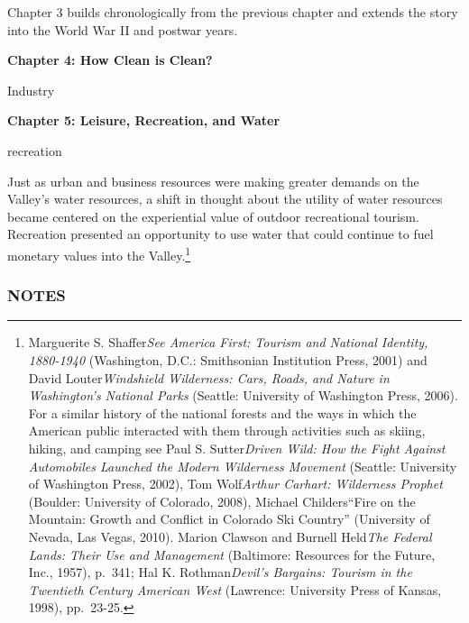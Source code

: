 \documentclass[11pt,article,oneside]{memoir}
\begin{document}
Chapter 3 builds chronologically from the previous chapter and extends
the story into the World War II and postwar years.

\textbf{Chapter 4: How Clean is Clean?}

Industry

\textbf{Chapter 5: Leisure, Recreation, and Water}

recreation

Just as urban and business resources were making greater demands on the
Valley's water resources, a shift in thought about the utility of water
resources became centered on the experiential value of outdoor
recreational tourism. Recreation presented an opportunity to use water
that could continue to fuel monetary values into the Valley.\footnote{Marguerite
  S. Shaffer\emph{See America First: Tourism and National Identity,
  1880-1940} (Washington, D.C.: Smithsonian Institution Press, 2001) and
  David Louter\emph{Windshield Wilderness: Cars, Roads, and Nature in
  Washington's National Parks} (Seattle: University of Washington Press,
  2006). For a similar history of the national forests and the ways in
  which the American public interacted with them through activities such
  as skiing, hiking, and camping see Paul S. Sutter\emph{Driven Wild:
  How the Fight Against Automobiles Launched the Modern Wilderness
  Movement} (Seattle: University of Washington Press, 2002), Tom
  Wolf\emph{Arthur Carhart: Wilderness Prophet} (Boulder: University of
  Colorado, 2008), Michael Childers``Fire on the Mountain: Growth and
  Conflict in Colorado Ski Country'' (University of Nevada, Las Vegas,
  2010). Marion Clawson and Burnell Held\emph{The Federal Lands: Their
  Use and Management} (Baltimore: Resources for the Future, Inc., 1957),
  p.~341; Hal K. Rothman\emph{Devil's Bargains: Tourism in the Twentieth
  Century American West} (Lawrence: University Press of Kansas, 1998),
  pp.~23-25.}

\subsubsection{NOTES}
\end{document}
